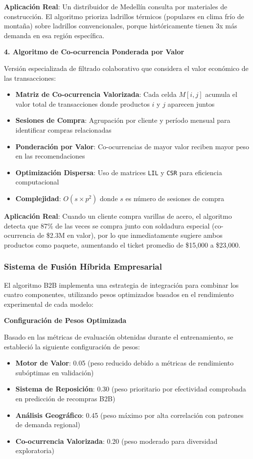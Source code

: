 \documentclass[twocolumn]{article}
\begin{document}
\textbf{Aplicación Real}: Un distribuidor de Medellín consulta por materiales de construcción. El algoritmo prioriza ladrillos térmicos (populares en clima frío de montaña) sobre ladrillos convencionales, porque históricamente tienen 3x más demanda en esa región específica.

\textbf{4. Algoritmo de Co-ocurrencia Ponderada por Valor}

Versión especializada de filtrado colaborativo que considera el valor económico de las transacciones:

\begin{itemize}
    \item \textbf{Matriz de Co-ocurrencia Valorizada}: Cada celda \(M[i,j]\) acumula el valor total de transacciones donde productos \(i\) y \(j\) aparecen juntos
    \item \textbf{Sesiones de Compra}: Agrupación por cliente y período mensual para identificar compras relacionadas
    \item \textbf{Ponderación por Valor}: Co-ocurrencias de mayor valor reciben mayor peso en las recomendaciones
    \item \textbf{Optimización Dispersa}: Uso de matrices \texttt{LIL} y \texttt{CSR} para eficiencia computacional
    \item \textbf{Complejidad}: \(O(s \times p^2)\) donde \(s\) es número de sesiones de compra
\end{itemize}

\textbf{Aplicación Real}: Cuando un cliente compra varillas de acero, el algoritmo detecta que 87\% de las veces se compra junto con soldadura especial (co-ocurrencia de \$2.3M en valor), por lo que inmediatamente sugiere ambos productos como paquete, aumentando el ticket promedio de \$15,000 a \$23,000.

\subsubsection{Sistema de Fusión Híbrida Empresarial}

El algoritmo B2B implementa una estrategia de integración para combinar los cuatro componentes, utilizando pesos optimizados basados en el rendimiento experimental de cada modelo:

\textbf{Configuración de Pesos Optimizada}

Basado en las métricas de evaluación obtenidas durante el entrenamiento, se estableció la siguiente configuración de pesos:

\begin{itemize}
    \item \textbf{Motor de Valor}: 0.05 (peso reducido debido a métricas de rendimiento subóptimas en validación)
    \item \textbf{Sistema de Reposición}: 0.30 (peso prioritario por efectividad comprobada en predicción de recompras B2B)
    \item \textbf{Análisis Geográfico}: 0.45 (peso máximo por alta correlación con patrones de demanda regional)
    \item \textbf{Co-ocurrencia Valorizada}: 0.20 (peso moderado para diversidad exploratoria)
\end{itemize}
\end{document}
